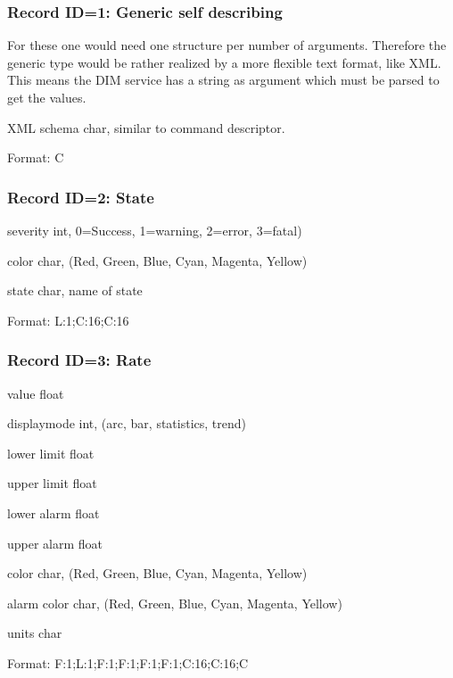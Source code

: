 \subsubsection{Record ID=1: Generic self describing}
For these one would need one structure per number of arguments. Therefore the generic type would be rather realized by a more flexible text format, like XML. This means the DIM service has a string as argument which must be parsed to get the values.
\begin{compactdesc}
\item[XML schema] char, similar to command descriptor.
\item[Format:] C
\end{compactdesc}

\subsubsection{Record ID=2: State}
\begin{compactdesc}
\item[severity] int, 0=Success, 1=warning, 2=error, 3=fatal)
\item[color] char, (Red, Green, Blue, Cyan, Magenta, Yellow)
\item[state] char, name of state
\item[Format:] L:1;C:16;C:16
\end{compactdesc}

\subsubsection{Record ID=3: Rate}
\begin{compactdesc}
\item[value]   float 
\item[displaymode ]   int, (arc, bar, statistics, trend)
\item[lower limit]   float 
\item[upper limit]   float 
\item[lower alarm]   float
\item[upper alarm]   float 
\item[color]   char,  (Red, Green, Blue, Cyan, Magenta, Yellow)
\item[alarm color]   char,  (Red, Green, Blue, Cyan, Magenta, Yellow)
\item[units]   char 
\item[Format:] F:1;L:1;F:1;F:1;F:1;F:1;C:16;C:16;C
\end{compactdesc}

